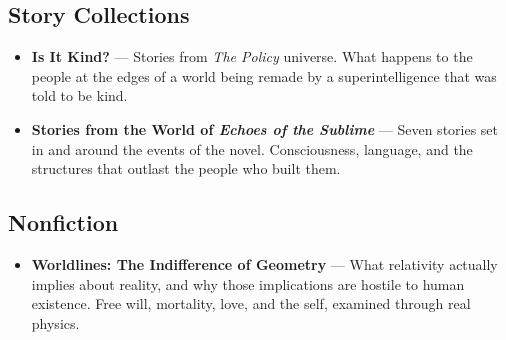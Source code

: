 \subsection*{Story Collections}

\begin{itemize}
\setlength{\itemsep}{1em}
\item \textbf{Is It Kind?} --- Stories from \textit{The Policy} universe. What happens to the people at the edges of a world being remade by a superintelligence that was told to be kind.

\item \textbf{Stories from the World of \textit{Echoes of the Sublime}} --- Seven stories set in and around the events of the novel. Consciousness, language, and the structures that outlast the people who built them.
\end{itemize}

\subsection*{Nonfiction}

\begin{itemize}
\setlength{\itemsep}{1em}
\item \textbf{Worldlines: The Indifference of Geometry} --- What relativity actually implies about reality, and why those implications are hostile to human existence. Free will, mortality, love, and the self, examined through real physics.
\end{itemize}
